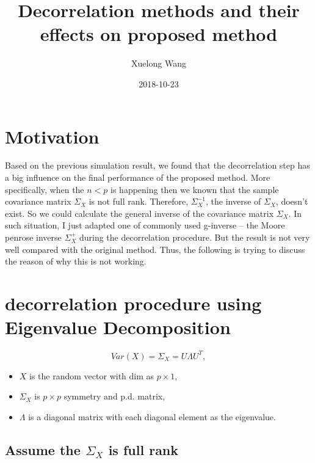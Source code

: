 \documentclass[]{article}
\title{Decorrelation methods and their effects on proposed method}
\author{Xuelong Wang}
\date{2018-10-23}
\providecommand{\tightlist}{%
  \setlength{\itemsep}{0pt}\setlength{\parskip}{0pt}}
\begin{document}
\maketitle

{
\setcounter{tocdepth}{2}
\tableofcontents
}
\section{Motivation}\label{motivation}

Based on the previous simulation result, we found that the decorrelation
step has a big influence on the final performance of the proposed
method. More specifically, when the \(n<p\) is happening then we known
that the sample covariance matrix \(\Sigma_{X}\) is not full rank.
Therefore, \(\Sigma^{-1}_X\), the inverse of \(\Sigma_{X}\), doesn't
exist. So we could calculate the general inverse of the covariance
matrix \(\Sigma_{X}\). In such situation, I just adapted one of commonly
used g-inverse -- the Moore penrose inverse \(\Sigma^{+}_X\) during the
decorrelation procedure. But the result is not very well compared with
the original method. Thus, the following is trying to discuss the reason
of why this is not working.

\section{decorrelation procedure using Eigenvalue
Decomposition}\label{decorrelation-procedure-using-eigenvalue-decomposition}

\[
  Var(X) = \Sigma_X = U\Lambda U^T,
\]

\begin{itemize}
\tightlist
\item
  \(X\) is the random vector with dim as \(p \times 1\),\\
\item
  \(\Sigma_X\) is \(p \times p\) symmetry and p.d. matrix,\\
\item
  \(\Lambda\) is a diagonal matrix with each diagonal element as the
  eigenvalue.
\end{itemize}

\subsection{\texorpdfstring{Assume the \(\Sigma_X\) is full
rank}{Assume the \textbackslash{}Sigma\_X is full rank}}\label{assume-the-sigma_x-is-full-rank}
\end{document}
